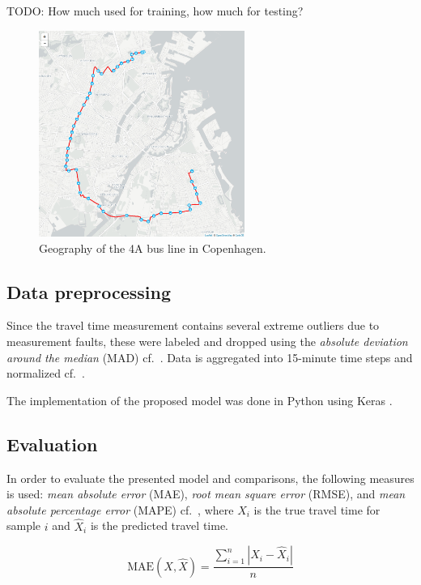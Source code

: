 \documentclass[preprint,12pt]{elsarticle}
\begin{document}
TODO: How much used for training, how much for testing?

\begin{figure}[!ht]
  \centering
  \includegraphics[width=0.6\textwidth]{drawings/4a.png}
  \caption{Geography of the 4A bus line in Copenhagen.}
  \label{fig:4a_map}
\end{figure}

\subsection{Data preprocessing}
Since the travel time measurement contains several extreme outliers due to measurement faults, these were labeled and dropped using the \emph{absolute deviation around the median} (MAD) cf.\ \cite{Olewuezi2011}. Data is aggregated into 15-minute time steps and normalized cf.~.

The implementation of the proposed model was done in Python using Keras \cite{Keras}.

\subsection{Evaluation}
In order to evaluate the presented model and comparisons, the following measures is used: \emph{mean absolute error} (MAE), \emph{root mean square error} (RMSE), and \emph{mean absolute percentage error} (MAPE) cf.~, where $X_i$ is the true travel time for sample $i$ and $\widehat{X}_i$ is the predicted travel time.

\begin{equation}
    \textrm{MAE}(X, \widehat{X}) = \frac{\sum_{i = 1}^{n} \left| X_i - \widehat{X}_i \right| }{n}
    \label{eq:mae}
\end{equation}
\end{document}
